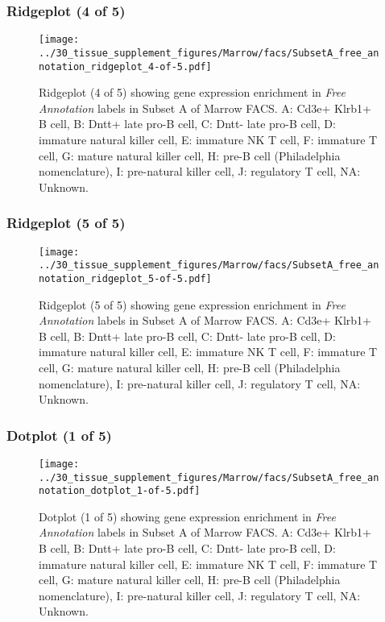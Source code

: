 \clearpage

\subsubsection{Ridgeplot (4 of 5)}
\begin{figure}[h]
\centering
\texttt{[image: ../30\_tissue\_supplement\_figures/Marrow/facs/SubsetA\_free\_annotation\_ridgeplot\_4-of-5.pdf]}

\caption{ Ridgeplot (4 of 5)  showing gene expression enrichment in \emph{Free Annotation} labels in Subset A of Marrow FACS. A: Cd3e+ Klrb1+ B cell, B: Dntt+ late pro-B cell, C: Dntt- late pro-B cell, D: immature natural killer cell, E: immature NK T cell, F: immature T cell, G: mature natural killer cell, H: pre-B cell (Philadelphia nomenclature), I: pre-natural killer cell, J: regulatory T cell, NA: Unknown.}
\end{figure}


\clearpage

\subsubsection{Ridgeplot (5 of 5)}
\begin{figure}[h]
\centering
\texttt{[image: ../30\_tissue\_supplement\_figures/Marrow/facs/SubsetA\_free\_annotation\_ridgeplot\_5-of-5.pdf]}

\caption{ Ridgeplot (5 of 5)  showing gene expression enrichment in \emph{Free Annotation} labels in Subset A of Marrow FACS. A: Cd3e+ Klrb1+ B cell, B: Dntt+ late pro-B cell, C: Dntt- late pro-B cell, D: immature natural killer cell, E: immature NK T cell, F: immature T cell, G: mature natural killer cell, H: pre-B cell (Philadelphia nomenclature), I: pre-natural killer cell, J: regulatory T cell, NA: Unknown.}
\end{figure}


\clearpage

\subsubsection{Dotplot (1 of 5)}
\begin{figure}[h]
\centering
\texttt{[image: ../30\_tissue\_supplement\_figures/Marrow/facs/SubsetA\_free\_annotation\_dotplot\_1-of-5.pdf]}

\caption{ Dotplot (1 of 5)  showing gene expression enrichment in \emph{Free Annotation} labels in Subset A of Marrow FACS. A: Cd3e+ Klrb1+ B cell, B: Dntt+ late pro-B cell, C: Dntt- late pro-B cell, D: immature natural killer cell, E: immature NK T cell, F: immature T cell, G: mature natural killer cell, H: pre-B cell (Philadelphia nomenclature), I: pre-natural killer cell, J: regulatory T cell, NA: Unknown.}
\end{figure}


